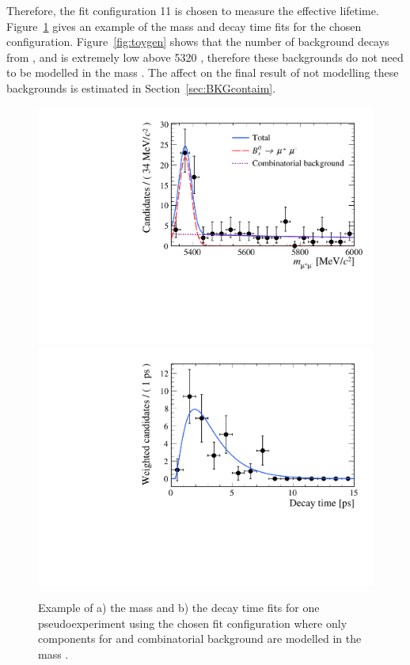 {%



Therefore, the fit configuration 11 is chosen to measure the \bsmumu effective lifetime. Figure~\ref{fig:toyegs} gives an example of the mass and decay time \ml fits for the chosen configuration. Figure~\ref{fig:toygen} shows that the number of background decays from \bdmumu, \bhh and \lambdab is extremely low above 5320 \mevcc, therefore these backgrounds do not need to be modelled in the mass \pdf. The affect on the final result of not modelling these backgrounds is estimated in Section~\ref{sec:BKGcontaim}.

\begin{figure}[tbp]
    \centering
        \includegraphics[width= 0.49 \textwidth]{./Figs/LifetimeMeasurement/5320-6000_toy_mass.pdf}
       \includegraphics[width=0.49 \textwidth]{./Figs/LifetimeMeasurement/5320-6000_toy_lifetime.pdf}
    \caption{Example of a) the mass and b) the decay time \ml fits for one pseudoexperiment using the chosen fit configuration where only components for \bsmumu and combinatorial background are modelled in the mass \pdf.}
    \label{fig:toyegs}
\end{figure}

}
